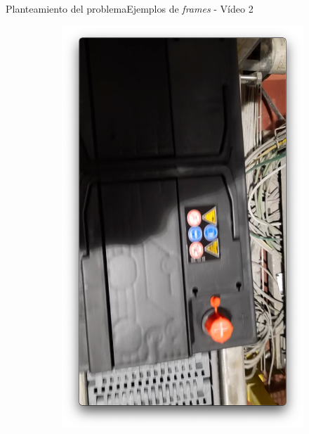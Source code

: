 \documentclass{beamer}
\begin{document}
\begin{frame}{Planteamiento del problema}{Ejemplos de \textit{frames} - Vídeo 2}
\begin{figure}
\begin{subfigure}[b]{0.4\textwidth}
        \includegraphics[width=\textwidth]{img/B4.png}
    \end{subfigure}
\end{figure}
\end{frame}
\end{document}
